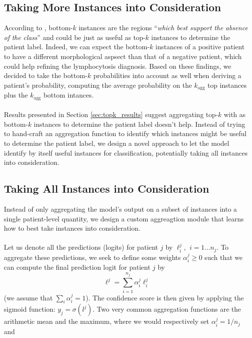 \documentclass[final]{cvpr}
\begin{document}
	\subsection{Taking More Instances into Consideration}
	\label{topbottom}
	
	According to \cite{owkin}, bottom-$k$ instances are the regions “\textit{which best support the absence of the class}” and could be just as useful as top-$k$ instances to determine the patient label. Indeed, we can expect the bottom-$k$ instances of a positive patient to have a different morphological aspsect than that of a negative patient, which could help refining the lymphocytosis diagnosis. Based on these findings, we decided to take the bottom-$k$ probabilities into account as well when deriving a patient's probability, computing the average probability on the $k_{\text{agg}}$ top instances plus the $k_{\text{agg}}$ bottom intances.\\
	\\
	Results presented in Section \ref{sec:topk_results} suggest aggregating top-$k$ with as bottom-$k$ instances to determine the patient label doesn't help. Instead of trying to hand-craft an aggregation function to identify which instances might be useful to determine the patient label, we design a novel approach to let the model identify by itself useful instances for classification, potentially taking all instances into consideration.
	
	\subsection{Taking All Instances into Consideration}
	\label{sec:custom}
	
	Instead of only aggregating the model's output on a subset of instances into a single patient-level quantity, we design a custom aggreagtion module that learns how to best take instances into consideration.\\
	\\
	Let us denote all the predictions (logits) for patient $j$ by $\ell_i^j$, $\: i=1 \dots n_j$.
	To aggregate these predictions, we seek to define some weights $\alpha_i^j \geq 0$ such that we can compute the final prediction logit for patient $j$ by
	$$\ell^j = \sum_{i=1}^{n_j} \alpha_i^j \ell_i^j$$
	(we assume that $\sum_i \alpha_i^j = 1$).
	The confidence score is then given by applying the sigmoid function: $y_j = \sigma(l^j)$.
	Two very common aggregation functions are the arithmetic mean and the maximum, where we would respectively set $\alpha_i^j = 1/n_j$ and 
	
\end{document}
